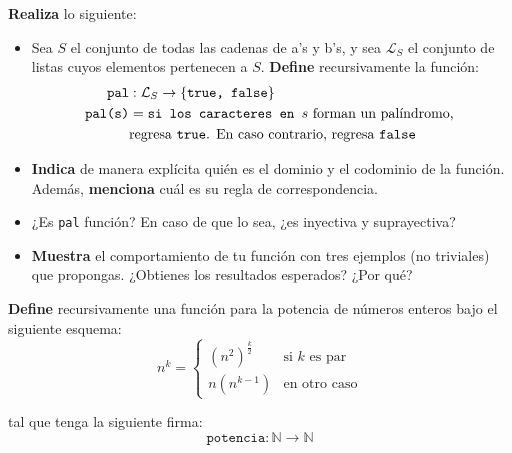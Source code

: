 \documentclass[oneside]{style}
\begin{document}
\begin{questions}[label=\protect\circled{\bfseries\arabic*}]
    \question
    {
        \textbf{Realiza} lo siguiente:
        \begin{itemize}
            \item Sea $S$ el conjunto de todas las cadenas de a's y b's, y sea 
            $\mathcal{L}_S$ el conjunto de listas cuyos elementos pertenecen a 
            $S$. \textbf{Define} recursivamente la función:
            \begin{align*}
                \texttt{pal}&: \mathcal{L}_S \rightarrow \{\texttt{true, 
                false}\} \\ 
                \texttt{pal(s)} &= \texttt{si los caracteres en } s 
                \text{ forman un palíndromo, } \\ 
                &\text{regresa \texttt{true}. En caso contrario, regresa 
                \texttt{false}} 
            \end{align*}

            \item \textbf{Indica} de manera explícita quién es el dominio y el 
            codominio de la función. Además, \textbf{menciona} cuál es su regla 
            de correspondencia.

            \item ¿Es \texttt{pal} función? En caso de que lo sea, ¿es inyectiva 
            y suprayectiva?

            \item \textbf{Muestra} el comportamiento de tu función con tres 
            ejemplos (no triviales) que propongas. ¿Obtienes los resultados 
            esperados? ¿Por qué?
        \end{itemize}
    }

    \question
    {
        \textbf{Define} recursivamente una función para la potencia de números
        enteros bajo el siguiente esquema:
        \[
            n^k = 
            \begin{cases} 
                (n^2)^{\frac{k}{2}} & \text{si $k$ es par} \\
                n(n^{k-1}) & \text{en otro caso}
            \end{cases}
        \]

        tal que tenga la siguiente firma:
        \begin{equation*}
            \texttt{potencia}: \mathbb{N} \rightarrow \mathbb{N}
        \end{equation*}

    }


\end{questions}
\end{document}
